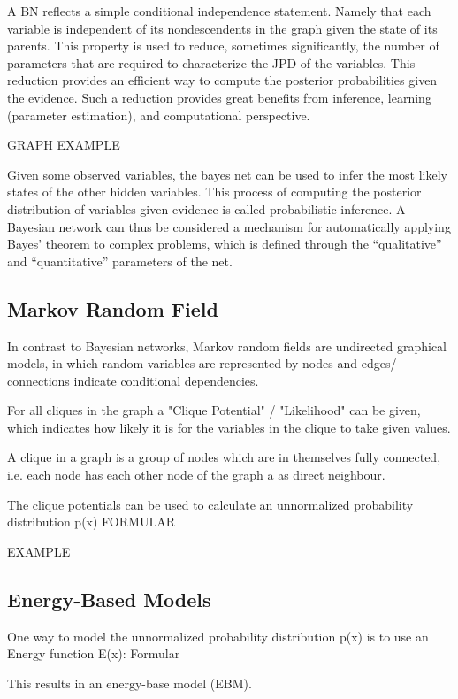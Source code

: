 A BN reflects a simple conditional independence statement. Namely that each variable is independent of its nondescendents in the graph given the state of its parents. 
This property is used to reduce, sometimes significantly, the number of parameters that are required to characterize the JPD of the variables. 
This reduction provides an efficient way to compute the posterior probabilities given the evidence.
Such a reduction provides great benefits from inference, learning (parameter estimation),
and computational perspective.

GRAPH EXAMPLE

Given some observed variables, the bayes net can be used to infer the most likely states of the other hidden variables. 
This process of computing the posterior distribution of variables given evidence is called probabilistic inference.
A Bayesian network can thus be considered a mechanism for automatically applying Bayes' theorem to complex problems, which is defined through the “qualitative” and  “quantitative” parameters of the net.

\subsection{Markov Random Field}

In contrast to Bayesian networks, Markov random fields are undirected graphical models, in which random variables are represented by nodes and edges/ connections indicate conditional dependencies.

For all cliques in the graph a "Clique Potential" / "Likelihood" can be given, which indicates how likely it is for the variables in the clique to take given values.

A clique in a graph is a group of nodes which are in themselves fully connected, i.e. each node has each other node of the graph a as direct neighbour. 

The clique potentials can be used to calculate an unnormalized probability distribution p(x) FORMULAR

EXAMPLE

\subsection{Energy-Based Models}

One way to model the unnormalized probability distribution p(x) is to use an Energy function E(x): Formular

This results in an energy-base model (EBM). 

